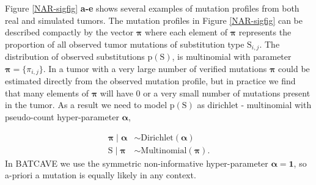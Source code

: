 \documentclass[a4,center,fleqn]{NAR}
\newcommand{\batcave}{BATCAVE }
\begin{document}
Figure \ref{NAR-sigfig} \textbf{a-e} shows several examples of mutation profiles from both real and simulated tumors.
The mutation profiles in Figure \ref{NAR-sigfig} can be described compactly by the vector $\boldsymbol{\pi}$ where each element of $\boldsymbol{\pi}$ represents the proportion of all observed tumor mutations of substitution type $\mathrm{S}_{i,j}$.
The distribution of observed substitutions $ \mathrm{p}(\mathrm{S}) $, is multinomial with parameter $ \boldsymbol{ \pi } = \{\pi_{i,j}\} $.
In a tumor with a very large number of verified mutations $\boldsymbol{\pi}$ could be estimated directly from the observed mutation profile, but in practice we find that many elements of $\boldsymbol{\pi}$ will have $0$ or a very small number of mutations present in the tumor.
As a result we need to model $\mathrm{p}(\mathrm{S})$ as dirichlet - multinomial with pseudo-count hyper-parameter $\boldsymbol{\alpha}$, 

$$
\begin{aligned}
  \boldsymbol{\pi} \mid \boldsymbol{\alpha} &\sim \textrm{Dirichlet}(\boldsymbol{\alpha}) \\
  \mathrm{S} \mid \boldsymbol{\pi} & \sim \textrm{Multinomial}(\boldsymbol{\pi}).
\end{aligned}
$$
In \batcave we use the symmetric non-informative hyper-parameter $\boldsymbol{\alpha} = \boldsymbol{1}$, so a-priori a mutation is equally likely in any context.
\end{document}
